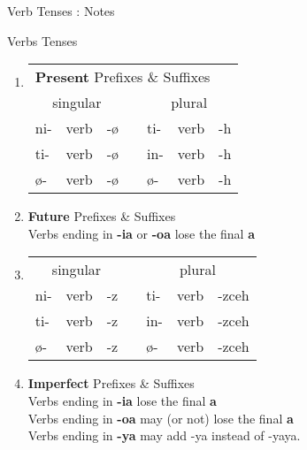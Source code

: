 \documentclass[12pt]{beamer}
\newcommand{\nah}[1]{\textcolor{nahgrn}{#1}}
\newcommand{\trs}[1]{\textcolor{nahblu}{#1}}
\begin{document}
\begin{frame}
\begin{columns}[t]
\begin{column}{.23\linewidth}
\begin{block}{Verb Tenses : Notes}
    		
    	\end{block}
    	\begin{block}{Verbs Tenses}
    		\begin{enumerate}
    			\item \begin{tabular}[t]{lllllll}
    				\multicolumn{7}{l}{\textbf{Present} \nah{Prefixes} \& \trs{Suffixes}}              \\
    				\multicolumn{3}{c}{singular}    & \vline & \multicolumn{3}{c}{plural}     \\
    				\cline{1-7}
    				\nah{ni-}   & verb & \trs{-ø}   & \vline & \nah{ti-}   & verb & \trs{-h}  \\
    				\nah{ti-}   & verb & \trs{-ø}   & \vline & \nah{in-}   & verb & \trs{-h}  \\
    				\nah{ø-}    & verb & \trs{-ø}   & \vline & \nah{ø-}    & verb & \trs{-h}  \\
    			\end{tabular}%
    			\item \textbf{Future} \nah{Prefixes} \& \trs{Suffixes}\\
    			Verbs ending in \textbf{-ia} or \textbf{-oa} lose the final \textbf{a}\\
    			\item \begin{tabular}[t]{lllllll}
    				\multicolumn{3}{c}{singular}    & \vline & \multicolumn{3}{c}{plural}        \\
    				\cline{1-7}
    				\nah{ni-}   & verb & \trs{-z}   & \vline & \nah{ti-}   & verb & \trs{-zceh}  \\
    				\nah{ti-}   & verb & \trs{-z}   & \vline & \nah{in-}   & verb & \trs{-zceh}  \\
    				\nah{ø-}    & verb & \trs{-z}   & \vline & \nah{ø-}    & verb & \trs{-zceh}  \\
    			\end{tabular}%
    			\item \textbf{Imperfect} \nah{Prefixes} \& \trs{Suffixes}\\
    			Verbs ending in \textbf{-ia} lose the final \textbf{a}\\
    			Verbs ending in \textbf{-oa} may (or not) lose the final \textbf{a}\\
    			Verbs ending in \textbf{-ya} may add \trs{-ya} instead of \trs{-yaya}.\\

\end{enumerate}
\end{block}
\end{column}
\end{columns}
\end{frame}
\end{document}
